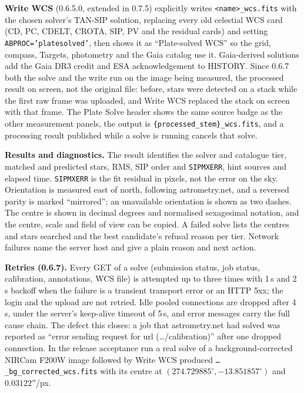 \documentclass[11pt,a4paper]{article}
\newcommand{\code}[1]{\texttt{\small #1}}
\begin{document}
    \textbf{Write WCS} (0.6.5.0, extended in 0.7.5) explicitly writes \code{<name>\_wcs.fits} with the chosen solver's TAN-SIP solution, replacing every old celestial WCS card (CD, PC, CDELT, CROTA, SIP, PV and the residual cards) and setting \code{ABPROC='platesolved'}, then shows it as ``Plate-solved WCS'' so the grid, compass, Targets, photometry and the Gaia catalog use it. Gaia-derived solutions add the Gaia DR3 credit and ESA acknowledgement to HISTORY. Since 0.6.7 both the solve and the write run on the image being measured, the processed result on screen, not the original file: before, stars were detected on a stack while the first raw frame was uploaded, and Write WCS replaced the stack on screen with that frame. The Plate Solve header shows the same source badge as the other measurement panels, the output is \code{\{processed\_stem\}\_wcs.fits}, and a processing result published while a solve is running cancels that solve.

    \textbf{Results and diagnostics.} The result identifies the solver and catalogue tier, matched and predicted stars, RMS, SIP order and \code{SIPMXERR}, hint sources and elapsed time. \code{SIPMXERR} is the fit residual in pixels, not the error on the sky. Orientation is measured east of north, following astrometry.net, and a reversed parity is marked ``mirrored''; an unavailable orientation is shown as two dashes. The centre is shown in decimal degrees and normalised sexagesimal notation, and the centre, scale and field of view can be copied. A failed solve lists the centres and stars searched and the best candidate's refusal reason per tier. Network failures name the server host and give a plain reason and next action.

    \textbf{Retries (0.6.7).} Every GET of a solve (submission status, job status, calibration, annotations, WCS file) is attempted up to three times with 1\,s and 2\,s backoff when the failure is a transient transport error or an HTTP 5xx; the login and the upload are not retried. Idle pooled connections are dropped after 4\,s, under the server's keep-alive timeout of 5\,s, and error messages carry the full cause chain. The defect this closes: a job that astrometry.net had solved was reported as ``error sending request for url (\ldots/calibration)'' after one dropped connection. In the release acceptance run a real solve of a background-corrected NIRCam F200W image followed by Write WCS produced \code{\ldots\_bg\_corrected\_wcs.fits} with its centre at $(274.729885^{\circ}, -13.851857^{\circ})$ and $0.03122''$/px.
\end{document}
